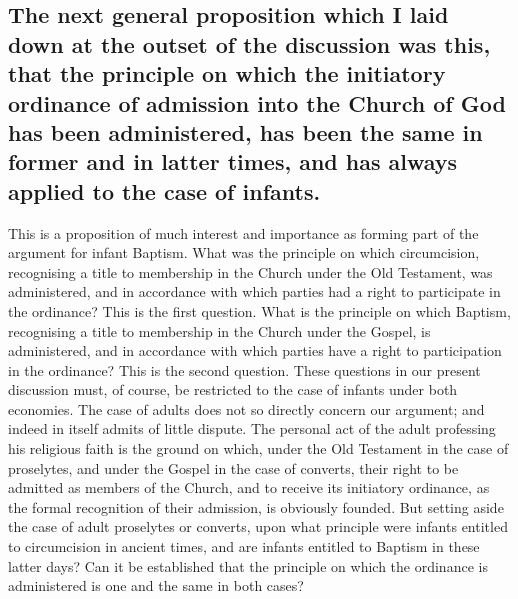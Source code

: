 \documentclass[]{book}
\begin{document}
\hypertarget{the-next-general-proposition-which-i-laid-down-at-the-outset-of-the-discussion-was-this-that-the-principle-on-which-the-initiatory-ordinance-of-admission-into-the-church-of-god-has-been-administered-has-been-the-same-in-former-and-in-latter-times-and-has-always-applied-to-the-case-of-infants.}{%
\subsection{The next general proposition which I laid down at the outset of the discussion was this, that the principle on which the initiatory ordinance of admission into the Church of God has been administered, has been the same in former and in latter times, and has always applied to the case of infants.}\label{the-next-general-proposition-which-i-laid-down-at-the-outset-of-the-discussion-was-this-that-the-principle-on-which-the-initiatory-ordinance-of-admission-into-the-church-of-god-has-been-administered-has-been-the-same-in-former-and-in-latter-times-and-has-always-applied-to-the-case-of-infants.}}

This is a proposition of much interest and importance as forming part of the argument for infant Baptism. What was the principle on which circumcision, recognising a title to membership in the Church under the Old Testament, was administered, and in accordance with which parties had a right to participate in the ordinance? This is the first question. What is the principle on which Baptism, recognising a title to membership in the Church under the Gospel, is administered, and in accordance with which parties have a right to participation in the ordinance? This is the second question. These questions in our present discussion must, of course, be restricted to the case of infants under both economies. The case of adults does not so directly concern our argument; and indeed in itself admits of little dispute. The personal act of the adult professing his religious faith is the ground on which, under the Old Testament in the case of proselytes, and under the Gospel in the case of converts, their right to be admitted as members of the Church, and to receive its initiatory ordinance, as the formal recognition of their admission, is obviously founded. But setting aside the case of adult proselytes or converts, upon what principle were infants entitled to circumcision in ancient times, and are infants entitled to Baptism in these latter days? Can it be established that the principle on which the ordinance is administered is one and the same in both cases?
\end{document}
